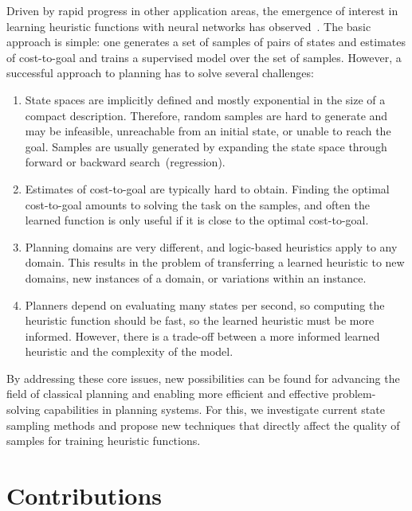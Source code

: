 Driven by rapid progress in other application areas, the emergence of interest in learning heuristic functions with neural networks has observed~\cite{samadi2008learning,arfaee2011learning,agostinelli2019solving,yu2020learning,shen2020learning,ferber2020neural,toyer2020asnets,ferber2022neural,otoole2022sampling}. The basic approach is simple: one generates a set of samples of pairs of states and estimates of cost-to-goal and trains a supervised model over the set of samples. However, a successful approach to planning has to solve several challenges:

\begin{enumerate}[label=C\arabic*),left=0pt]
    \itemsep0pt
    \item State spaces are implicitly defined and mostly exponential in the size of a compact description. Therefore, random samples are hard to generate and may be infeasible, unreachable from an initial state, or unable to reach the goal. Samples are usually generated by expanding the state space through forward or backward search~(regression).
    \item Estimates of cost-to-goal are typically hard to obtain. Finding the optimal cost-to-goal amounts to solving the task on the samples, and often the learned function is only useful if it is close to the optimal cost-to-goal.
    \item Planning domains are very different, and logic-based heuristics apply to any domain. This results in the problem of transferring a learned heuristic to new domains, new instances of a domain, or variations within an instance.
    \item Planners depend on evaluating many states per second, so computing the heuristic function should be fast, so the learned heuristic must be more informed. However, there is a trade-off between a more informed learned heuristic and the complexity of the model.
\end{enumerate}

By addressing these core issues, new possibilities can be found for advancing the field of classical planning and enabling more efficient and effective problem-solving capabilities in planning systems. For this, we investigate current state sampling methods and propose new techniques that directly affect the quality of samples for training heuristic functions.

\section{Contributions}
\label{sec:contributions}

